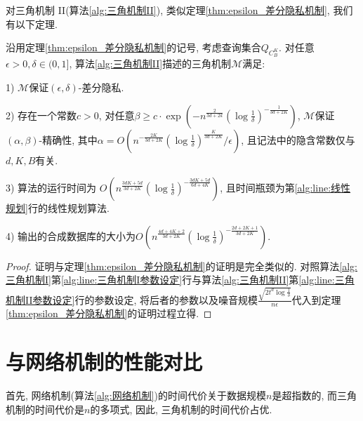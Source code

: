 对三角机制 II(算法\ref{alg:三角机制II}), 类似定理\ref{thm:epsilon_差分隐私机制}, 我们有以下定理.
\begin{thm}\label{thm:epsilon_delta_差分隐私机制}
  沿用定理\ref{thm:epsilon_差分隐私机制}的记号, 考虑查询集合$Q_{C_B^K}$. 对任意$\epsilon > 0, \delta\in(0, 1]$, 算法\ref{alg:三角机制II}描述的三角机制$\mathcal{M}$满足:
  
  1) $\mathcal{M}$保证$(\epsilon, \delta)$-差分隐私.
  
  2) 存在一个常数$c > 0$, 对任意$\beta \ge c \cdot \exp\left(-n^{\frac{2}{3d+2k}}\left(\log\frac{1}{\delta}\right)^{-\frac{1}{3d+2K}}\right)$, $\mathcal{M}$保证$(\alpha, \beta)$-精确性, 其中$\alpha=O \left(n^{-\frac{2K}{3d+2K}}\left(\log\frac{1}{\delta}\right)^{\frac{K}{3d+2K}}/\epsilon \right)$, 且记法中的隐含常数仅与$d, K, B$有关.
  
  3) 算法的运行时间为 $O \left(n^{\frac{3dK+5d}{3d+2K}}\left(\log\frac{1}{\delta}\right)^{-\frac{3dK+5d}{6d+4K}}\right)$, 且时间瓶颈为第\ref{alg:line:线性规划}行的线性规划算法.
  
  4) 输出的合成数据库的大小为$O \left(n^{\frac{4d+4K+2}{3d+2K}}
\left(\log\frac{1}{\delta}\right) ^{-\frac{2d+2K+1}{3d+2K}} \right)$.
\end{thm}
\begin{proof}
  证明与定理\ref{thm:epsilon_差分隐私机制}的证明是完全类似的. 对照算法\ref{alg:三角机制I}第\ref{alg:line:三角机制I参数设定}行与算法\ref{alg:三角机制II}第\ref{alg:line:三角机制II参数设定}行的参数设定, 将后者的参数以及噪音规模$\frac{\sqrt{2t^d\log\frac{1}{\delta}}}{n \epsilon}$代入到定理\ref{thm:epsilon_差分隐私机制}的证明过程立得. 
\end{proof}
\section{与网络机制的性能对比} %
\label{sec:与网络机制的性能对比}
首先, 网络机制(算法\ref{alg:网络机制})的时间代价关于数据规模$n$是超指数的, 而三角机制的时间代价是$n$的多项式, 因此, 三角机制的时间代价占优.

